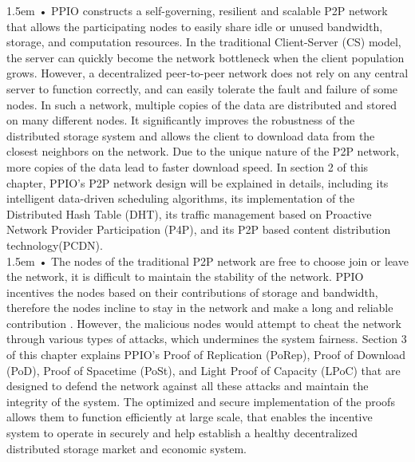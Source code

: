 \documentclass[10pt,a4paper]{article}
\begin{document}
\hangindent 1.5em
\noindent   
• PPIO constructs a self-governing, resilient and scalable P2P network that allows the participating nodes to easily share idle or unused bandwidth, storage, and computation resources. In the traditional Client-Server (CS) model, the server can quickly become the network bottleneck when the client population grows. However, a decentralized peer-to-peer network does not rely on any central server to function correctly, and can easily tolerate the fault and failure of some nodes. In such a network, multiple copies of the data are distributed and stored on many different nodes. It significantly improves the robustness of the distributed storage system and allows the client to download data from the closest neighbors on the network. Due to the unique nature of the P2P network, more copies of the data lead to faster download speed. In section 2 of this chapter, PPIO's P2P network design will be explained in details, including its intelligent data-driven scheduling algorithms, its implementation of the Distributed Hash Table (DHT), its traffic management based on Proactive Network Provider Participation (P4P), and its P2P based content distribution technology(PCDN).
\vspace{-0.6em}
\\ 

\hangindent 1.5em
\noindent   
• The nodes of the traditional P2P network are free to choose join or leave the network, it is difficult to maintain the stability of the network. PPIO incentives the nodes based on their contributions of storage and bandwidth, therefore the nodes incline to stay in the network and make a long and reliable contribution \cite{article1}. However, the malicious nodes would attempt to cheat the network through various types of attacks, which undermines the system fairness. Section 3 of this chapter explains PPIO's Proof of Replication (PoRep), Proof of Download (PoD), Proof of Spacetime (PoSt), and Light Proof of Capacity (LPoC) that are designed to defend the network against all these attacks and maintain the integrity of the system. The optimized and secure implementation of the proofs allows them to function efficiently at large scale, that enables the incentive system to operate in securely and help establish a healthy decentralized distributed storage market and economic system.
\vspace{-0.6em}
\\ 
\end{document}

